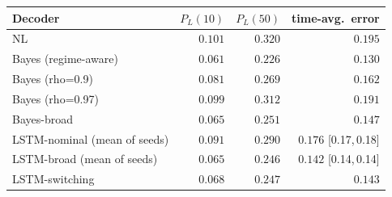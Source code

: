 \begin{tabular}{lrrr}
\toprule
Decoder & $P_L(10)$ & $P_L(50)$ & time-avg.\ error \\
\midrule
NL & $0.101$ & $0.320$ & $0.195$ \\
Bayes (regime-aware) & $0.061$ & $0.226$ & $0.130$ \\
Bayes (rho=0.9) & $0.081$ & $0.269$ & $0.162$ \\
Bayes (rho=0.97) & $0.099$ & $0.312$ & $0.191$ \\
Bayes-broad & $0.065$ & $0.251$ & $0.147$ \\
LSTM-nominal (mean of seeds) & $0.091$ & $0.290$ & $0.176$ {\scriptsize[0.17,\,0.18]} \\
LSTM-broad (mean of seeds) & $0.065$ & $0.246$ & $0.142$ {\scriptsize[0.14,\,0.14]} \\
LSTM-switching & $0.068$ & $0.247$ & $0.143$ \\
\bottomrule
\end{tabular}